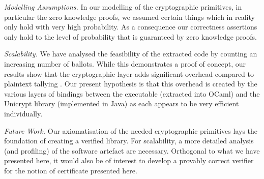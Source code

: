 \documentclass{llncs}
\begin{document}
\smallskip\noindent\emph{Modelling Assumptions.} In our modelling of
the cryptographic primitives, in particular the zero knowledge
proofs, we assumed certain things which in reality only hold with
very high probability. As a
consequence our correctness assertions only hold to the level
of probability that is guaranteed by zero knowledge proofs.

\smallskip\noindent\emph{Scalability.} We have analysed the
feasibility of the extracted code by counting an increasing number
of ballots. While this demonstrates a proof of concept, our results
show that the cryptographic layer adds significant overhead compared
to plaintext tallying \cite{Pattinson:2017:SVE}.  Our present
hypothesis is that this overhead is created by the various layers of
bindings between the executable (extracted into OCaml) and the
Unicrypt library (implemented in Java) as each appears to be very
efficient individually. 

\smallskip\noindent\emph{Future Work.} Our axiomatisation of the
needed cryptographic primitives lays the foundation of creating a
verified library. For scalability, a more detailed analysis (and
profiling) of the software artefact are necessary. Orthogonal to
what we have presented here, it would also be of interest to develop
a provably correct verifier for the notion of certificate presented
here. 




%

%
%
\end{document}
